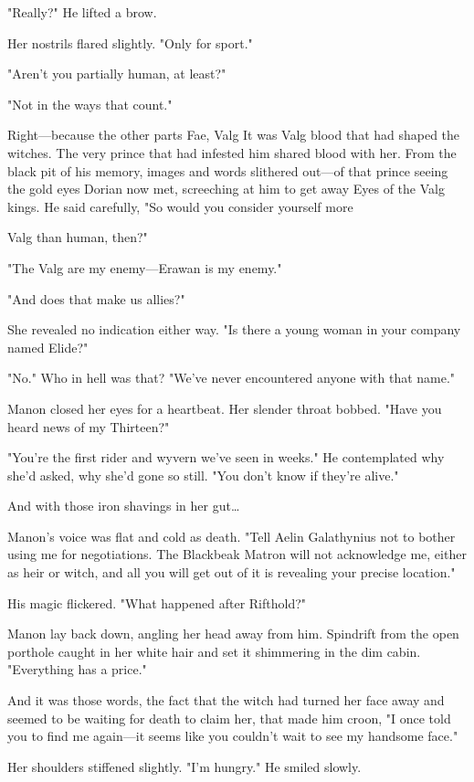 "Really?" He lifted a brow.

Her nostrils flared slightly. "Only for sport."

"Aren't you  partially human, at least?"

"Not in the ways that count."

Right---because the other parts  Fae, Valg  It was Valg blood that had shaped the witches. The very prince that had infested him shared blood with her. From the black pit of his memory, images and words slithered out---of that prince seeing the gold eyes Dorian now met, screeching at him to get away  Eyes of the Valg kings. He said carefully, "So would you consider yourself more

Valg than human, then?"

"The Valg are my enemy---Erawan is my enemy."

"And does that make us allies?"

She revealed no indication either way. "Is there a young woman in your company named Elide?"

"No." Who in hell was that? "We've never encountered anyone with that name."

Manon closed her eyes for a heartbeat. Her slender throat bobbed. "Have you heard news of my Thirteen?"

"You're the first rider and wyvern we've seen in weeks." He contemplated why she'd asked, why she'd gone so still. "You don't know if they're alive."

And with those iron shavings in her gut\ldots{}

Manon's voice was flat and cold as death. "Tell Aelin Galathynius not to bother using me for negotiations. The Blackbeak Matron will not acknowledge me, either as heir or witch, and all you will get out of it is revealing your precise location."

His magic flickered. "What happened after Rifthold?"

Manon lay back down, angling her head away from him. Spindrift from the open porthole caught in her white hair and set it shimmering in the dim cabin. "Everything has a price."

And it was those words, the fact that the witch had turned her face away and seemed to be waiting for death to claim her, that made him croon, "I once told you to find me again---it seems like you couldn't wait to see my handsome face."

Her shoulders stiffened slightly. "I'm hungry." He smiled slowly.

